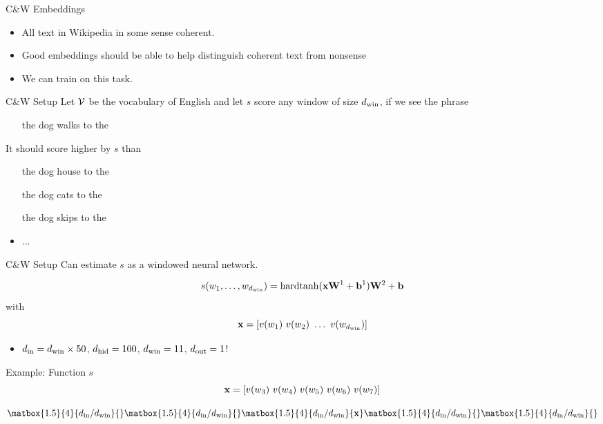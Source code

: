 \documentclass{beamer}
\begin{document}
\begin{frame}{C\&W Embeddings}
  \begin{itemize}
  \item All text in Wikipedia in some sense coherent. 
    \air
  \item Good embeddings should be able to help distinguish coherent text from nonsense
    \air 

  \item We can train on this task.
  \end{itemize}
\end{frame}


\begin{frame}{C\&W Setup}
  Let $\mathcal{V}$ be the vocabulary of English and let $s$ 
  score any window of size ${d_{\mathrm{win}}}$, if we see the phrase

  \begin{itemize}
  \item [ the dog walks to the ]
  \end{itemize}

  It should score higher by $s$ than 

  \begin{itemize}
  \item [ the dog \alert{house} to the ]
  \item [ the dog \alert{cats} to the ]
  \item [ the dog \alert{skips} to the ]
  \item ...
  \end{itemize}
\end{frame}

\begin{frame}{C\&W Setup}
  Can estimate $s$ as a windowed neural network.

  \[ s(w_1, \ldots, w_{{d_{\mathrm{win}}}}) = \mathrm{hardtanh}(\mathbf{x} \mathbf{W}^1 + \mathbf{b}^1) \mathbf{W}^2 + \mathbf{b} \] 
  with 
  \[ \mathbf{x} = [v(w_1)\  v(w_2) \  \ldots \  v(w_{{d_{\mathrm{win}}}})]  \]

  \begin{itemize}
  \item ${d_{\mathrm{in}}} = {d_{\mathrm{win}}} \times 50$, ${d_{\mathrm{hid}}} = 100$, ${d_{\mathrm{win}}}=11$, \alert{${d_{\mathrm{out}}} = 1$}!  
  \end{itemize}

  Example: Function $s$
  \[ \boldx = [v(w_3)\  v(w_4) \  v(w_5) \ v(w_6) \ v(w_7)]  \]

  \[\renewcommand\matscale{.6}
  \matbox{1.5}{4}{\din /\dwin}{} \matbox{1.5}{4}{\din /\dwin}{} \matbox{1.5}{4}{\din /\dwin}{\boldx} \matbox{1.5}{4}{\din /\dwin}{} \matbox{1.5}{4}{\din /\dwin}{}\]
\end{frame}
\end{document}

